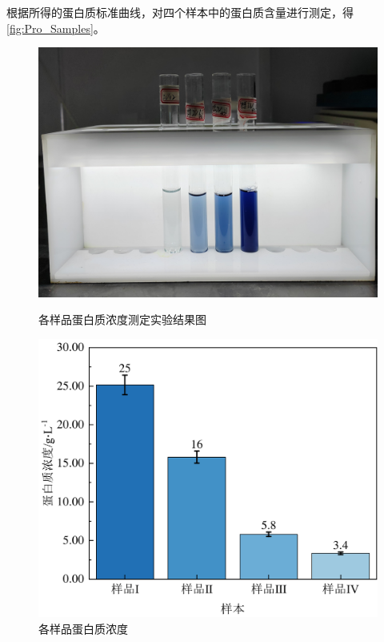 根据所得的蛋白质标准曲线，对四个样本中的蛋白质含量进行测定，得\autoref{fig:Pro_Samples}。

\begin{figure}[H]
    \begin{minipage}[t]{0.49\textwidth}
        \includegraphics[width = \textwidth]{figure/1124/Pro_Samples.jpg}
        \caption{各样品蛋白质浓度测定实验结果图}
        \label{fig:Pro_Samples_result}
    \end{minipage}
    \begin{minipage}[t]{0.48\textwidth}
        \includegraphics[width = \textwidth]{figure/1124/Protein_Samples.pdf}
        \caption{各样品蛋白质浓度}
        \label{fig:Pro_Samples}
    \end{minipage}
\end{figure}

